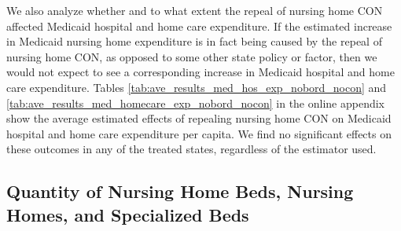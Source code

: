 \documentclass[../Main.tex]{subfiles}
\begin{document}
\indent We also analyze whether and to what extent the repeal of nursing home CON affected Medicaid hospital and home care expenditure. If the estimated increase in Medicaid nursing home expenditure is in fact being caused by the repeal of nursing home CON, as opposed to some other state policy or factor, then we would not expect to see a corresponding increase in Medicaid hospital and home care expenditure. Tables \ref*{tab:ave_results_med_hos_exp_nobord_nocon} and \ref*{tab:ave_results_med_homecare_exp_nobord_nocon} in the online appendix show the average estimated effects of repealing nursing home CON on Medicaid hospital and home care expenditure per capita. We find no significant effects on these outcomes in any of the treated states, regardless of the estimator used.


\subsection{Quantity of Nursing Home Beds, Nursing Homes, and Specialized Beds}
\end{document}
